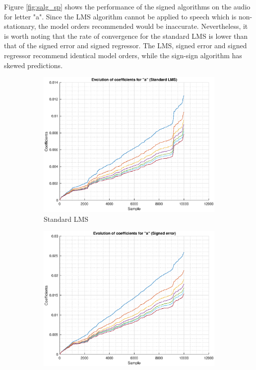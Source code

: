 \documentclass{article}
\begin{document}
Figure \ref{fig:salg_sp} shows the performance of the signed algorithms on the audio for letter "a". Since the LMS algorithm cannot be applied to speech which is non-stationary, the model orders recommended would be inaccurate. Nevertheless, it is worth noting that the rate of convergence for the standard LMS is lower than that of the signed error and signed regressor. The LMS, signed error and signed regressor recommend identical model orders, while the sign-sign algorithm has skewed predictions.


\begin{figure}[h!]
\centering
\begin{subfigure}{0.24\textwidth}
\centering
\includegraphics[width = \textwidth]{salg_lms_sp}
\caption{Standard LMS}
\label{fig:salg_lms_sp}
\end{subfigure}
\begin{subfigure}{0.24\textwidth}
\centering
\includegraphics[width = \textwidth]{salg_signerr_sp}

\end{subfigure}
\end{figure}
\end{document}
